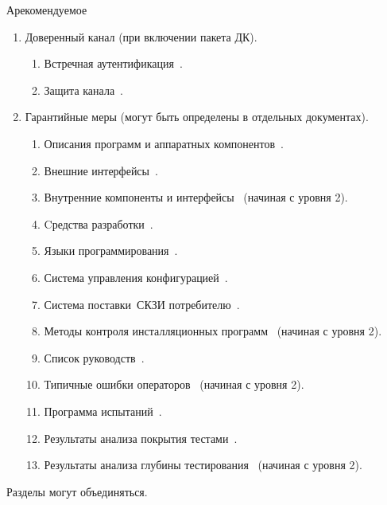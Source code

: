\begin{appendix}{А}{рекомендуемое}
\begin{enumerate}
\begin{enumerate}
\end{enumerate}

\item
Доверенный канал (при включении пакета ДК).

\begin{enumerate}
\item
Встречная аутентификация~.
\item
Защита канала~.
\end{enumerate}


\item
Гарантийные меры (могут быть определены в отдельных документах).
\begin{enumerate}
\item
Описания программ и аппаратных компонентов~.

\item
Внешние интерфейсы~.

\item
Внутренние компоненты и интерфейсы~
(начиная с уровня 2).

\item
Cредства разработки~.

\item
Языки программирования~.

\item
Система управления конфигурацией~.

\item
Система поставки~СКЗИ потребителю~.

\item
Методы контроля инсталляционных программ~
(начиная с уровня 2).

\item
Список руководств~.

\item
Типичные ошибки операторов~
(начиная с уровня 2).

\item
Программа испытаний~.

\item
Результаты анализа покрытия тестами~.

\item
Результаты анализа глубины тестирования~
(начиная с уровня 2).
\end{enumerate}
\end{enumerate}

Разделы могут объединяться.

\end{appendix}

